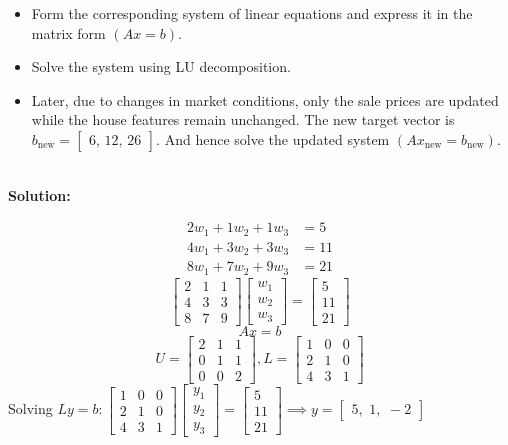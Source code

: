 \documentclass[DIV=20,oneside]{scrartcl}
\newcommand{\solution}{
	\noindent\textbf{\\Solution: }
}
\begin{document}
\begin{itemize}[itemsep=0.5pt, topsep=1pt]
	\item Form the corresponding system of linear equations and express it in the matrix form $(Ax=b)$.
	\item Solve the system using LU decomposition.
	\item Later, due to changes in market conditions, only the sale prices are updated while the house features remain unchanged. The new target vector is $b_{\text{new}}=
	\begin{bmatrix}
		6,\, 12,\, 26
	\end{bmatrix}.$ And hence solve the updated system $(Ax_{\text{new}}=b_{\text{new}})$.		
\end{itemize}
\solution
$$\begin{aligned}
	2w_1 + 1w_2 + 1w_3 &= 5 \\
	4w_1 + 3w_2 + 3w_3 &= 11 \\
	8w_1 + 7w_2 + 9w_3 &= 21
\end{aligned}$$
$$\begin{bmatrix} 2 & 1 & 1 \\ 4 & 3 & 3 \\ 8 & 7 & 9 \end{bmatrix} \begin{bmatrix} w_1 \\ w_2 \\ w_3 \end{bmatrix} = \begin{bmatrix} 5 \\ 11 \\ 21 \end{bmatrix}$$
$$Ax=b$$
$$U = \begin{bmatrix} 2 & 1 & 1 \\ 0 & 1 & 1 \\ 0 & 0 & 2 \end{bmatrix}, L = \begin{bmatrix} 1 & 0 & 0 \\ 2 & 1 & 0 \\ 4 & 3 & 1 \end{bmatrix}$$
Solving $Ly=b: \begin{bmatrix} 1 & 0 & 0 \\ 2 & 1 & 0 \\ 4 & 3 & 1 \end{bmatrix} \begin{bmatrix} y_1 \\ y_2 \\ y_3 \end{bmatrix} = \begin{bmatrix} 5 \\ 11 \\ 21 \end{bmatrix}\implies y = \begin{bmatrix} 5, \,\, 1, \,\, -2 \end{bmatrix}$
\end{document}
